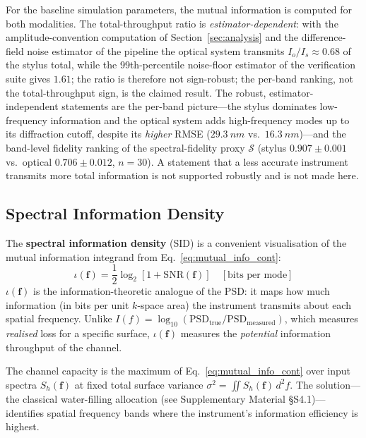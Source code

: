 \documentclass[review,12pt]{elsarticle}
\begin{document}
For the baseline simulation parameters, the mutual information is computed for both modalities. The total-throughput ratio is \emph{estimator-dependent}: with the amplitude-convention computation of Section~\ref{sec:analysis} and the difference-field noise estimator of the pipeline the optical system transmits $I_o/I_s \approx 0.68$ of the stylus total, while the 99th-percentile noise-floor estimator of the verification suite gives $1.61$; the ratio is therefore not sign-robust; the per-band ranking, not the total-throughput sign, is the claimed result. The robust, estimator-independent statements are the per-band picture---the stylus dominates low-frequency information and the optical system adds high-frequency modes up to its diffraction cutoff, despite its \emph{higher} RMSE ($\SI{29.3}{nm}$ vs.\ $\SI{16.3}{nm}$)---and the band-level fidelity ranking of the spectral-fidelity proxy $\mathcal{S}$ (stylus $0.907\pm0.001$ vs.\ optical $0.706\pm0.012$, $n=30$). A statement that a less accurate instrument transmits more total information is not supported robustly and is not made here.

\subsection{Spectral Information Density}

The \textbf{spectral information density} (SID) is a convenient visualisation of the mutual information integrand from Eq.~\ref{eq:mutual_info_cont}:
\begin{equation}
    \iota(\mathbf{f}) = \frac{1}{2}\log_2\!\left[1 + \mathrm{SNR}(\mathbf{f})\right] \quad [\text{bits per mode}]
    \label{eq:sid}
\end{equation}
$\iota(\mathbf{f})$ is the information-theoretic analogue of the PSD: it maps how much information (in bits per unit $ k$-space area) the instrument transmits about each spatial frequency. Unlike $I(f) = \log_{10}(\mathrm{PSD}_\mathrm{true}/\mathrm{PSD}_\mathrm{measured})$, which measures \emph{realised} loss for a specific surface, $\iota(\mathbf{f})$ measures the \emph{potential} information throughput of the channel.

The channel capacity is the maximum of Eq.~\ref{eq:mutual_info_cont} over input spectra $S_h(\mathbf{f})$ at fixed total surface variance $\sigma^2 = \iint S_h(\mathbf{f})\,d^2\!f$. The solution---the classical water-filling allocation (see Supplementary Material \S S4.1)---identifies spatial frequency bands where the instrument's information efficiency is highest.
\end{document}
